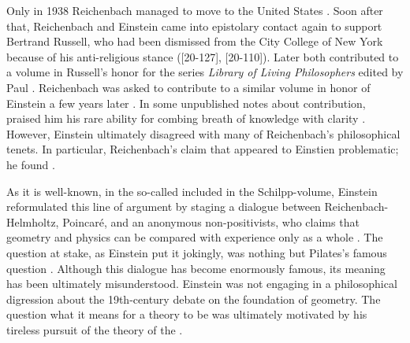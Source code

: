 \documentclass[final]{article}
\begin{document}
%
%
%
%
%
%
%


Only in 1938 Reichenbach managed to move to the United States \citep{Verhaegh2020a}. Soon after that, Reichenbach and Einstein came into epistolary contact again to support Bertrand Russell, who had been dismissed from the City College of New York because of his anti-religious stance ([20-127], [20-110]). Later both contributed \citep{Reichenbach1944,Einstein1944b} to a volume in Russell's honor for the series \textit{Library of Living Philosophers} edited by Paul \citet{Schilpp1944}. Reichenbach was asked to contribute to a similar volume in honor of Einstein a few years later \citep{Schilpp1949}. In some unpublished notes about  contribution, \citet{Einstein1949f} praised him his rare ability for combing breath of knowledge with clarity   \citep{Einstein1949f}. However, Einstein ultimately disagreed with many of Reichenbach's philosophical tenets. In particular, Reichenbach's claim that  appeared to Einstien problematic; he found  \citep{Einstein1949f}. 

As it is well-known, in the so-called  \citep{Einstein1949a} included in the Schilpp-volume, Einstein reformulated this line of argument by staging a dialogue between Reichenbach-Helmholtz, Poincaré, and an anonymous non-positivists, who claims that geometry and physics can be compared with experience only as a whole \citep[676f.]{Einstein1949a}. The question at stake, as Einstein put it jokingly, was nothing but Pilates's famous question  \parencite[John 18:38, quoted in][676]{Einstein1949a}. Although this dialogue has become enormously famous, its meaning has been ultimately misunderstood. Einstein was not engaging in a philosophical digression about the 19th-century debate on the foundation of geometry. The question what it means for a theory to be  was ultimately motivated by his tireless pursuit of the theory of the . 
\end{document}
